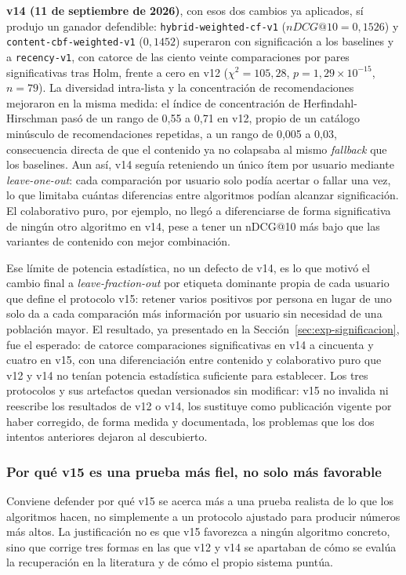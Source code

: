 \textbf{v14 (11 de septiembre de 2026)}, con esos dos cambios ya aplicados, sí produjo un
ganador defendible: \texttt{hybrid-weighted-cf-v1} (\(nDCG@10=0{,}1526\)) y
\texttt{content-cbf-weighted-v1} (\(0{,}1452\)) superaron con significación a los baselines y
a \texttt{recency-v1}, con catorce de las ciento veinte comparaciones por pares significativas
tras Holm, frente a cero en v12 (\(\chi^2=105{,}28\), \(p=1{,}29\times10^{-15}\), \(n=79\)). La
diversidad intra-lista y la concentración de recomendaciones mejoraron en la misma medida: el
índice de concentración de Herfindahl-Hirschman pasó de un rango de 0,55 a 0,71 en v12, propio
de un catálogo minúsculo de recomendaciones repetidas, a un rango de 0,005 a 0,03, consecuencia
directa de que el contenido ya no colapsaba al mismo \emph{fallback} que los baselines. Aun
así, v14 seguía reteniendo un único ítem por usuario mediante \emph{leave-one-out}: cada
comparación por usuario solo podía acertar o fallar una vez, lo que limitaba cuántas
diferencias entre algoritmos podían alcanzar significación. El colaborativo puro, por ejemplo,
no llegó a diferenciarse de forma significativa de ningún otro algoritmo en v14, pese a tener
un nDCG@10 más bajo que las variantes de contenido con mejor combinación.

Ese límite de potencia estadística, no un defecto de v14, es lo que motivó el cambio final a
\emph{leave-fraction-out} por etiqueta dominante propia de cada usuario que define el
protocolo v15: retener varios positivos por persona en lugar de uno solo da a cada comparación
más información por usuario sin necesidad de una población mayor. El resultado, ya presentado
en la Sección~\ref{sec:exp-significacion}, fue el esperado: de catorce comparaciones
significativas en v14 a cincuenta y cuatro en v15, con una diferenciación entre contenido y
colaborativo puro que v12 y v14 no tenían potencia estadística suficiente para establecer.
Los tres protocolos y sus artefactos quedan versionados sin modificar: v15 no invalida ni
reescribe los resultados de v12 o v14, los sustituye como publicación vigente por haber
corregido, de forma medida y documentada, los problemas que los dos intentos anteriores dejaron
al descubierto.

\subsubsection{Por qué v15 es una prueba más fiel, no solo más favorable}\label{sec:exp-v15-fidelidad}

Conviene defender por qué v15 se acerca más a una prueba realista de lo que los algoritmos
hacen, no simplemente a un protocolo ajustado para producir números más altos. La
justificación no es que v15 favorezca a ningún algoritmo concreto, sino que corrige tres
formas en las que v12 y v14 se apartaban de cómo se evalúa la recuperación en la literatura y
de cómo el propio sistema puntúa.


